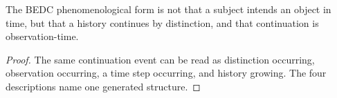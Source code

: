 \begin{corollary}
\label{cor:philosophy-bedc-phenomenological-form}
The BEDC phenomenological form is not that a subject intends an object
in time, but that a history continues by distinction, and that
continuation is observation-time.
\end{corollary}
\begin{proof}
The same continuation event can be read as distinction occurring,
observation occurring, a time step occurring, and history growing. The
four descriptions name one generated structure.
\end{proof}
